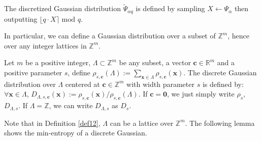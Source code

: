 \documentclass[a4paper,11pt,onecolumn]{elsarticle}
\begin{document}
	
	\begin{definition}  \label{def11}
	 The discretized Gaussian distribution $\widetilde{\Psi}_{\alpha q}$ is defined by sampling $X \leftarrow \Psi_{\alpha}$ then outputting $\lfloor q \cdot X\rceil \text{ mod } q$. 
	\end{definition}
	In particular, we can define a Gaussian distribution over a subset of $\mathbb{Z}^m$, hence over any integer lattices in  $\mathbb{Z}^m$. 
	\begin{definition} \label{def12}
		Let $m$ be a positive integer,  $\Lambda \subset \mathbb{Z}^m$ be any subset,  a vector $\mathbf{c}\in \mathbb{R}^m$ and a positive parameter $s$, define   $\rho_{s, \mathbf{c}}(\Lambda ):=\sum_{\mathbf{x} \in \Lambda } \rho_{s, \mathbf{c}}(\mathbf{x})$. The discrete Gaussian distribution over $\Lambda$ centered at $\mathbf{c} \in \mathbb{Z}^m$ with width parameter $s$ is defined by:
		$\forall \mathbf{x}\in \Lambda$, $D_{\Lambda,  s, \mathbf{c}}(\mathbf{x}):=\rho_{s,\mathbf{c}}(\mathbf{x})/\rho_{s,\mathbf{c}}(\Lambda).$ If $\mathbf{c}=\mathbf{0}$, we just simply write  $\rho_{s}$, $D_{\Lambda,s}.$ If $\Lambda=\mathbb{Z}$,  we can write $D_{\Lambda,s}$ as $D_{s}.$
	\end{definition}
	Note that in Definition \ref{def12}, $\Lambda$ can be a lattice over $\mathbb{Z}^m$. 	The following lemma shows the min-entropy of a discrete Gaussian.
	
		\iffalse A continuous Gaussian with width parameter $s:=\alpha q$ has standard deviation $\sigma=\frac{\alpha q} {\sqrt{2 \pi}}$, hence the discrete Gaussian with width parameter $\alpha q$. It is known that this still roughly holds for the discretized Gaussian, as long as
	$\sigma$ is greater than the smoothing parameter  (see Definition \ref{smt} below) $\eta_{\epsilon}(\mathbb{Z})$ of $\mathbb{Z}$. (See for the discussion in \cite[page 170]{APS15}). This means that we  can identify the discretized $\widetilde{\Psi}_{\alpha q}$ with the discrete $D_{\alpha q}$ if $\frac{\alpha q} {\sqrt{2 \pi}} \geq \eta_{\epsilon}(\mathbb{Z})$.
	
		We present the definition of smoothing parameters below. Note that, smoothing parameters is also utilized to measure the quality of a lattice. 
	
	\begin{definition}[Smoothing Parameters, \cite{MR07}]\label{smt}
		 For any $n$-dimensional lattice $\Lambda$ and positive real $\epsilon>0$, the smoothing parameter $\eta_{\epsilon}(\Lambda)$ is the smallest real $s>0$ such that $\rho_{1/s}(\Lambda^*\setminus \{\mathbf{0}\}) \leq \epsilon$, where $\Lambda^*$ is the dual lattice of $\Lambda$, i.e.,  $\Lambda^*:=\{\textbf{x}\in \text{span}(\Lambda): \langle \textbf{x}, \textbf{y} \rangle \in \mathbb{Z}, \forall \textbf{y}\in \Lambda\}$.
	\end{definition}
	\fi 
\end{document}
